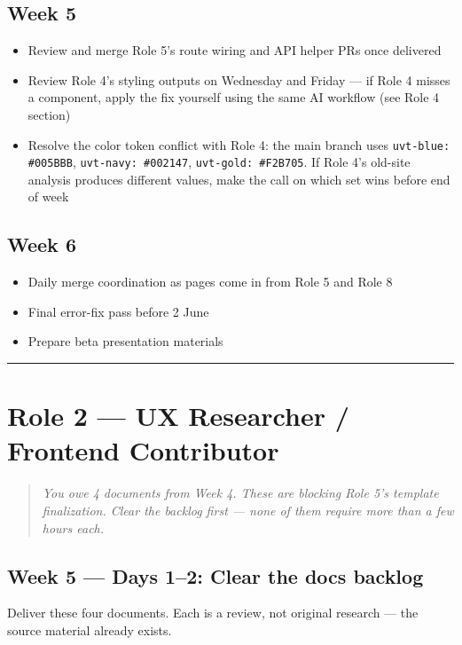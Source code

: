 \documentclass[11pt,a4paper]{article}
\newcommand{\grouprule}{\vspace{0.3em}\textcolor{ruleLine}{\rule{\linewidth}{0.4pt}}\vspace{0.3em}}
\begin{document}
\subsection{Week 5}

\begin{itemize}
\item Review and merge Role 5's route wiring and API helper PRs once delivered
\item Review Role 4's styling outputs on Wednesday and Friday — if Role 4 misses a component, apply the fix yourself using the same AI workflow (see Role 4 section)
\item Resolve the color token conflict with Role 4: the main branch uses \nolinkurl{uvt-blue: #005BBB}, \nolinkurl{uvt-navy: #002147}, \nolinkurl{uvt-gold: #F2B705}. If Role 4's old-site analysis produces different values, make the call on which set wins before end of week
\end{itemize}

\subsection{Week 6}

\begin{itemize}
\item Daily merge coordination as pages come in from Role 5 and Role 8
\item Final error-fix pass before 2 June
\item Prepare beta presentation materials
\end{itemize}

\grouprule

\section{Role 2 — UX Researcher / Frontend Contributor}

\begin{quote}\itshape
You owe 4 documents from Week 4. These are blocking Role 5's template finalization. Clear the backlog first — none of them require more than a few hours each.
\end{quote}

\subsection{Week 5 — Days 1–2: Clear the docs backlog}

Deliver these four documents. Each is a review, not original research — the source material already exists.
\end{document}
